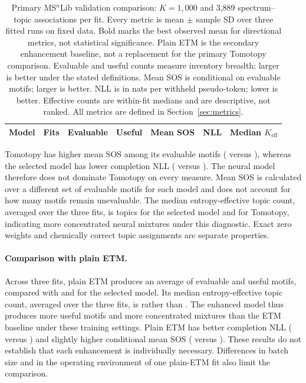 \documentclass[10pt,a4paper]{article}
\begin{document}
\begin{table}[H]
\centering\small
\setlength{\tabcolsep}{6pt}
\caption{Primary MS$^{n}$Lib validation comparison: $K=1,000$ and 3,889
spectrum--topic associations per fit. Every metric is mean $\pm$ sample SD
over three fitted runs on fixed data. Bold marks the best observed
mean for directional metrics, not statistical significance.
Plain ETM is the secondary enhancement baseline, not a replacement for the
primary Tomotopy comparison. Evaluable and useful counts measure inventory
breadth; larger is better under the stated definitions. Mean SOS is conditional
on evaluable motifs; larger is better. NLL is in nats per withheld pseudo-token;
lower is better. Effective counts are within-fit medians and are descriptive,
not ranked. All metrics are defined in Section~\ref{sec:metrics}.}
\label{tab:validation}
\setlength{\tabcolsep}{4pt}
\begin{tabular}{@{}lrrrrrr@{}}
\toprule
Model & Fits & Evaluable & Useful & Mean SOS & NLL & Median $K_{\mathrm{eff}}$ \\
\midrule

\end{tabular}
\end{table}

Tomotopy has higher mean SOS among its evaluable motifs
(\ReferenceLDASOS{} versus \CurrentSOSMean{}), whereas the selected model has
lower completion NLL (\CurrentNLLMean{} versus \ReferenceLDANLL{}).
The neural model therefore does not dominate Tomotopy on every measure.
Mean SOS is calculated over a different set of evaluable motifs for each model
and does not account for how many motifs remain unevaluable.
The median entropy-effective topic count, averaged over the three fits, is
\CurrentEffectiveMean{} topics for the selected model and
\ReferenceLDAEffective{} for Tomotopy, indicating more concentrated neural
mixtures under this diagnostic. Exact zero weights and chemically correct
topic assignments are separate properties.

\paragraph{Comparison with plain ETM.}

Across three fits, plain ETM produces an average of
\ReferenceCanonicalEvaluable{} evaluable and \ReferenceCanonicalUseful{}
useful motifs, compared with \CurrentEvaluableMean{} and
\CurrentUsefulMean{} for the selected model. Its median entropy-effective
topic count, averaged over the three fits, is \ReferenceCanonicalEffective{}
rather than \CurrentEffectiveMean{}.
The enhanced model thus produces more useful motifs and more
concentrated mixtures than the ETM baseline under these training settings.
Plain ETM has better completion NLL
(\ReferenceCanonicalNLL{} versus \CurrentNLLMean{}) and slightly higher
conditional mean SOS (\ReferenceCanonicalSOS{} versus \CurrentSOSMean{}).
These results do not establish that each enhancement is individually necessary.
Differences in batch size and in the operating environment of one plain-ETM
fit also limit the comparison.
\end{document}
